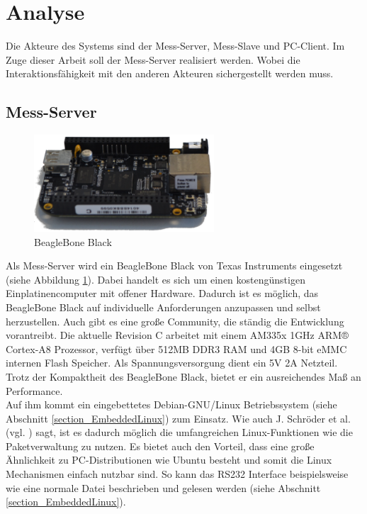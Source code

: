 \section{Analyse}

Die Akteure des Systems sind der Mess-Server, Mess-Slave und PC-Client. Im Zuge dieser Arbeit soll der Mess-Server realisiert werden. Wobei die Interaktionsfähigkeit mit den anderen Akteuren sichergestellt werden muss.


\subsection{Mess-Server}
\label{section_Mess-Server}

\begin{figure}[H]
\begin{center}
\includegraphics[width=0.6\textwidth]{img/general/BeagleBoneBlack.png}
\caption{BeagleBone Black}
\label{figure_Beagleboneblack}
\end{center}
\end{figure}


Als Mess-Server wird ein BeagleBone Black von Texas Instruments eingesetzt (siehe Abbildung \ref{figure_Beagleboneblack}). Dabei handelt es sich um einen kostengünstigen Einplatinencomputer mit offener Hardware. Dadurch ist es möglich, das BeagleBone Black auf individuelle Anforderungen anzupassen und selbst herzustellen. Auch gibt es eine große Community, die ständig die Entwicklung vorantreibt.
Die aktuelle Revision C arbeitet mit einem AM335x 1GHz ARM® Cortex-A8 Prozessor, verfügt über 512MB DDR3 RAM und 4GB 8-bit eMMC internen Flash Speicher. Als Spannungsversorgung dient ein 5V 2A Netzteil. Trotz der Kompaktheit des BeagleBone Black, bietet er ein ausreichendes Maß an Performance.\\
Auf ihm kommt ein eingebettetes Debian-GNU/Linux Betriebssystem (siehe Abschnitt \ref{section_EmbeddedLinux}) zum Einsatz. Wie auch J. Schröder et al. (vgl. \cite{schroeder2009embedded}) sagt, ist es dadurch möglich die umfangreichen Linux-Funktionen wie die Paketverwaltung zu nutzen. Es bietet auch den Vorteil, dass eine große Ähnlichkeit zu PC-Distributionen wie Ubuntu besteht und somit die Linux Mechanismen einfach nutzbar sind. So kann das RS232 Interface beispielsweise wie eine normale Datei beschrieben und gelesen werden (siehe Abschnitt \ref{section_EmbeddedLinux}).

